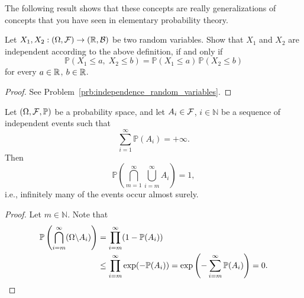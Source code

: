 The following result shows that these concepts are really generalizations of concepts that you have seen in elementary probability theory.

\begin{lemma}\label{lem:independence_random_variables}
Let $X_1, X_2: (\Omega, \mathcal F) \to (\mathbb R, \mathcal B)$ be two random variables. Show that $X_1$ and $X_2$ are independent according to the above definition, if and only if 
	\[
	\mathbb{P}( X_1 \leq a,\; X_2 \leq b ) = \mathbb{P}(X_1 \leq a)\, \mathbb{P}(X_2 \leq b)
	\]
	for every $a \in \mathbb R$, $b \in \mathbb R$.
\end{lemma}

\begin{proof}
See Problem~\ref{prb:independence_random_variables}.
\end{proof}

\begin{theorem}
	Let $(\Omega, \mathcal F, \mathbb{P})$ be a probability space, and let $A_i \in \mathcal F$, $i \in \mathbb{N}$ be a sequence of independent events such that
	\[
		\sum_{i=1}^\infty \mathbb{P}(A_i) = +\infty.
	\]
	Then
	\[
	\mathbb{P} \left( \bigcap_{m = 1}^\infty \bigcup_{i=m}^\infty A_i \right) = 1,
	\]
	i.e., infinitely many of the events occur almost surely.
\end{theorem}
\begin{proof}
	Let $m \in \mathbb{N}$. Note that
	\begin{align*}
	\mathbb{P}\left(\bigcap_{i=m}^{\infty} (\Omega \backslash A_i) \right) &= 
	\prod_{i=m}^\infty (1 - \mathbb{P}(A_i)) \\
	&\leq \prod_{i=m}^\infty \exp(- \mathbb{P}(A_i)) 
	= \exp\left(- \sum_{i=m}^\infty \mathbb{P}(A_i)\right) = 0.\qedhere
	\end{align*}
\end{proof}

